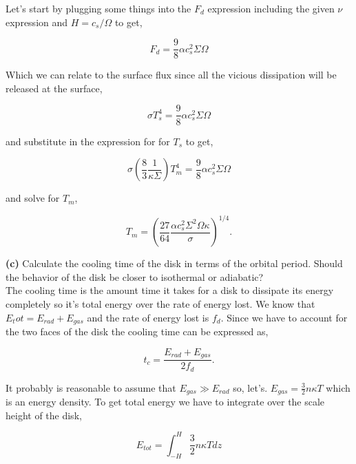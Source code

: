 \documentclass[12pt]{article}
\begin{document}
\noindent Let's start by plugging some things into the $F_d$ expression including the given $\nu$ expression and $H = c_s / \Omega$ to get, 

\begin{equation}
F_d = \frac{9}{8} \alpha c_s^2 \Sigma \Omega
\end{equation}

\noindent Which we can relate to the surface flux since all the vicious dissipation will be released at the surface,

\begin{equation}
\sigma T_s^4 = \frac{9}{8} \alpha c_s^2 \Sigma \Omega 
\end{equation}

\noindent and substitute in the expression for for $T_s$ to get,

\begin{equation}
\sigma \left( \frac{8}{3} \frac{1}{\kappa \Sigma}\right) T_m^4 = \frac{9}{8} \alpha c_s^2 \Sigma \Omega 
\end{equation}

\noindent and solve for $T_m$, 

\begin{equation}
T_m = \left( \frac{27}{64} \frac{\alpha c_s^2 \Sigma^2 \Omega \kappa}{\sigma} \right)^{1/4}.
\end{equation}


\noindent \textbf{(c)} Calculate the cooling time of the disk in terms of the orbital period. Should the behavior of the disk be closer to isothermal or adiabatic? \\

\noindent The cooling time is the amount time it takes for a disk to dissipate its energy completely so it's total energy over the rate of energy lost. We know that $E_tot = E_{rad} + E_{gas}$ and the rate of energy lost is $f_d$. Since we have to account for the two faces of the disk the cooling time can be expressed as,

\begin{equation}
t_c = \frac{E_{rad} + E_{gas}}{2f_d}.
\end{equation}

\noindent It probably is reasonable to assume that $E_{gas} \gg E_{rad}$ so, let's. $E_{gas} = \frac{3}{2} n \kappa T$ which is an energy density. To get total energy we have to integrate over the scale height of the disk,

\begin{equation}
E_{tot} = \int_{-H}^{H}  \frac{3}{2} n \kappa T dz 
\end{equation}
\end{document}
